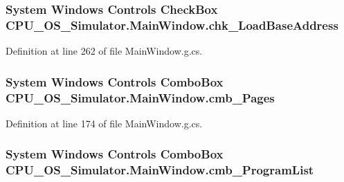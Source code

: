 \subsubsection[{chk\+\_\+\+Load\+Base\+Address}]{\setlength{\rightskip}{0pt plus 5cm}System Windows Controls Check\+Box C\+P\+U\+\_\+\+O\+S\+\_\+\+Simulator.\+Main\+Window.\+chk\+\_\+\+Load\+Base\+Address\hspace{0.3cm}{\ttfamily [package]}}\label{class_c_p_u___o_s___simulator_1_1_main_window_a8ade8cf3e5e2ec2374c984dac406b5e9}


Definition at line 262 of file Main\+Window.\+g.\+cs.

\hypertarget{class_c_p_u___o_s___simulator_1_1_main_window_a8da421354f40baef03909c87c3407e3c}{}
\subsubsection[{cmb\+\_\+\+Pages}]{\setlength{\rightskip}{0pt plus 5cm}System Windows Controls Combo\+Box C\+P\+U\+\_\+\+O\+S\+\_\+\+Simulator.\+Main\+Window.\+cmb\+\_\+\+Pages\hspace{0.3cm}{\ttfamily [package]}}\label{class_c_p_u___o_s___simulator_1_1_main_window_a8da421354f40baef03909c87c3407e3c}


Definition at line 174 of file Main\+Window.\+g.\+cs.

\hypertarget{class_c_p_u___o_s___simulator_1_1_main_window_a9871f5933923725d4386a7a7f3f8828f}{}
\subsubsection[{cmb\+\_\+\+Program\+List}]{\setlength{\rightskip}{0pt plus 5cm}System Windows Controls Combo\+Box C\+P\+U\+\_\+\+O\+S\+\_\+\+Simulator.\+Main\+Window.\+cmb\+\_\+\+Program\+List\hspace{0.3cm}{\ttfamily [package]}}\label{class_c_p_u___o_s___simulator_1_1_main_window_a9871f5933923725d4386a7a7f3f8828f}


